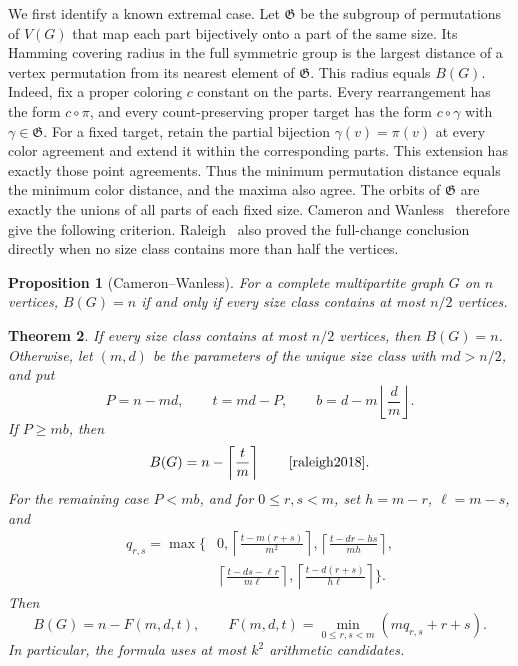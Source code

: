 \documentclass[10pt,a4paper]{amsart}
\numberwithin{equation}{section}
\newtheorem{theorem}{Theorem}[section]
\newtheorem{proposition}[theorem]{Proposition}
\theoremstyle{definition}
\theoremstyle{remark}
\begin{document}
We first identify a known extremal case. Let $\mathfrak G$ be the subgroup
of permutations of $V(G)$ that map each part bijectively onto a part of
the same size. Its Hamming covering radius in the full symmetric group
is the largest distance of a vertex permutation from its nearest element
of $\mathfrak G$. This radius equals $B(G)$.
Indeed, fix a proper coloring $c$ constant on the parts.
Every rearrangement has the form $c\circ\pi$, and every count-preserving
proper target has the form $c\circ\gamma$ with $\gamma\in\mathfrak G$.
For a fixed target, retain the partial bijection $\gamma(v)=\pi(v)$
at every color agreement and extend it within the corresponding parts.
This extension has exactly those point agreements. Thus the minimum
permutation distance equals the minimum color distance, and the maxima
also agree. The orbits of $\mathfrak G$ are exactly the unions of all
parts of each fixed size.
Cameron and Wanless~\cite[Theorem~14]{cameronwanless2005} therefore give
the following criterion. Raleigh~\cite[Theorem~1]{raleigh2018} also
proved the full-change conclusion directly when no size class contains
more than half the vertices.

\begin{proposition}[Cameron--Wanless]\label{cor:mp:full-change}
For a complete multipartite graph $G$ on $n$ vertices, $B(G)=n$ if and
only if every size class contains at most $n/2$ vertices.
\end{proposition}


\begin{theorem}\label{thm:mp:ordinary}
If every size class contains at most $n/2$ vertices, then $B(G)=n$.
Otherwise, let $(m,d)$ be the parameters of the unique size class with
$md>n/2$, and put
\[
 P=n-md,\qquad t=md-P,\qquad
 b=d-m\left\lfloor\frac d m\right\rfloor.
\]
If $P\ge mb$, then
\begin{equation}\label{eq:mp:raleigh-regime}
 B(G)=n-\left\lceil\frac t m\right\rceil
 \qquad\text{\cite[Theorem~4]{raleigh2018}}.
\end{equation}
For the remaining case $P<mb$, and for $0\le r,s<m$, set $h=m-r$,
$\ell=m-s$, and
\begin{equation}\label{eq:mp:ordinary-q}
\begin{split}
 q_{r,s}=\max\bigg\{&0,
 \left\lceil\frac{t-m(r+s)}{m^2}\right\rceil,
 \left\lceil\frac{t-dr-hs}{mh}\right\rceil,\\
 &\left\lceil\frac{t-ds-\ell r}{m\ell}\right\rceil,
 \left\lceil\frac{t-d(r+s)}{h\ell}\right\rceil\bigg\}.
\end{split}
\end{equation}
Then
\begin{equation}\label{eq:mp:ordinary}
 B(G)=n-F(m,d,t),\qquad
 F(m,d,t)=\min_{0\le r,s<m}(mq_{r,s}+r+s).
\end{equation}
In particular, the formula uses at most $k^2$ arithmetic candidates.
\end{theorem}
\end{document}
